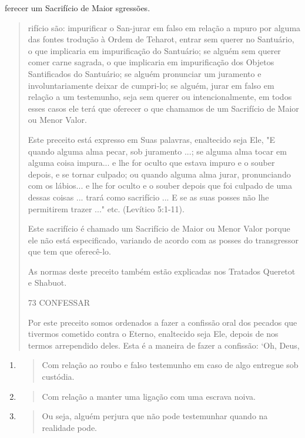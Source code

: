 ferecer um Sacrifício de Maior sgressões.

\begin{quote}
rifício são: impurificar o San-jurar em falso em relação a mpuro por
alguma das fontes trodução à Ordem de Teharot, entrar sem querer no
Santuário, o que implicaria em impurificação do Santuá­rio; se alguém
sem querer comer carne sagrada, o que implicaria em impurifi­cação dos
Objetos Santificados do Santuário; se alguém pronunciar um jura­mento e
involuntariamente deixar de cumpri-lo; se alguém, jurar em falso em
relação a um testemunho, seja sem querer ou intencionalmente, em todos
es­ses casos ele terá que oferecer o que chamamos de um Sacrifício de
Maior ou Menor Valor.

Este preceito está expresso em Suas palavras, enaltecido seja Ele, "E
quando alguma alma pecar, sob juramento ...; se alguma alma tocar em
alguma coisa impura... e lhe for oculto que estava impuro e o souber
depois, e se tor­nar culpado; ou quando alguma alma jurar, pronunciando
com os lábios... e lhe for oculto e o souber depois que foi culpado de
uma dessas coisas ... trará como sacrifício ... E se as suas posses não
lhe permitirem trazer ..." etc. (Levíti­co 5:1-11).

Este sacrifício é chamado um Sacrifício de Maior ou Menor Valor por­que
ele não está especificado, variando de acordo com as posses do
transgres­sor que tem que oferecê-lo.

As normas deste preceito também estão explicadas nos Tratados Que­retot
e Shabuot.

73 CONFESSAR

Por este preceito somos ordenados a fazer a confissão oral dos peca­dos
que tivermos cometido contra o Eterno, enaltecido seja Ele, depois de
nos termos arrependido deles. Esta é a maneira de fazer a confissão:
`Oh, Deus,
\end{quote}

\begin{enumerate}
\def\labelenumi{\arabic{enumi}.}
\setcounter{enumi}{89}
\item
  \begin{quote}
  Com relação ao roubo e falso testemunho em caso de algo entregue sob
  custódia.
  \end{quote}
\item
  \begin{quote}
  Com relação a manter uma ligação com uma escrava noiva.
  \end{quote}
\item
  \begin{quote}
  Ou seja, alguém perjura que não pode testemunhar quando na realidade
  pode.
  \end{quote}
\end{enumerate}


